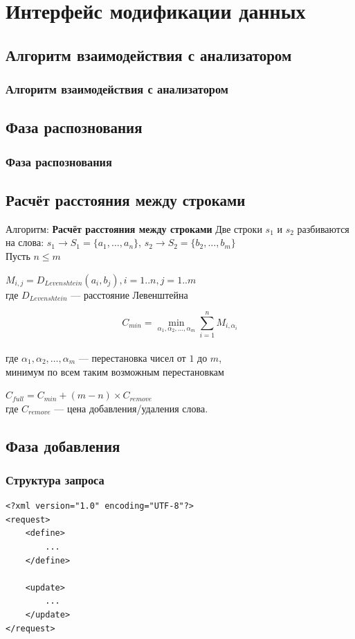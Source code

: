 \documentclass[utf8,handout]{beamer}
\begin{document}
\section{Интерфейс модификации данных}
	\subsection{Алгоритм взаимодействия с анализатором}
	\begin{frame}
 		\frametitle{Алгоритм взаимодействия с анализатором}
	\end{frame}
	
	\subsection{Фаза распознования}
	\begin{frame}
 		\frametitle{Фаза распознования}
 	\end{frame}

	\subsection{Расчёт расстояния между строками}
	\begin{frame}
 		\begin{block}{Алгоритм: \textbf{Расчёт расстояния между строками}}
 			Две строки $s_{1}$ и $s_{2}$ разбиваются на слова:
 			$s_{1}\rightarrow S_{1}=\lbrace a_{1},\ldots,a_{n}\rbrace$, $s_{2}\rightarrow S_{2}=\lbrace b_{2},\ldots,b_{m}\rbrace$ \\
 			Пусть $n\leq m$

			$ M_{i,j} = D_{Levenshtein}(a_{i},b_{j}), i=1..n, j=1..m $ \\
			где $D_{Levenshtein}$ --- расстояние Левенштейна
			
			\[	C_{min}=\min_{\alpha_1, \alpha_2, \ldots, \alpha_m}{\sum_{i=1}^{n} M_{i,\alpha_{i}}} \] \\
			где $\alpha_1, \alpha_2, \ldots, \alpha_m$ --- перестановка чисел от $1$ до $m$,\\
			минимум по всем таким возможным перестановкам

			$C_{full}=C_{min}+(m-n)\times C_{remove}$\\
			где $C_{remove}$ --- цена добавления/удаления слова.
		\end{block}
	\end{frame}

	\subsection{Фаза добавления}
		\begin{frame}[fragile]
 			\frametitle{Структура запроса}
 			\begin{verbatim}
<?xml version="1.0" encoding="UTF-8"?>
<request>
    <define>
        ...
    </define>

    <update>
        ...
    </update>
</request>
			\end{verbatim}
		\end{frame}
	
\end{document}
